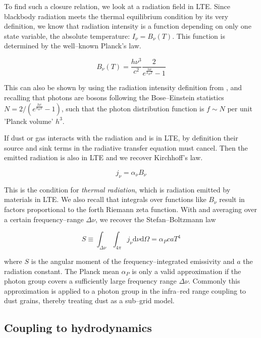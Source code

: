 To find such a closure relation, we look at a radiation field in LTE.
Since blackbody radiation meets the thermal equilibrium condition by its very definition, we know that radiation intensity is a function depending on only one state variable, the absolute temperature: $I_{\nu} = B_{\nu}(T)$.
This function is determined by the well--known Planck's law.

\begin{equation}
  B_{\nu}(T) = \frac{h\nu^{3}}{c^{2}} \frac{2}{e^{\frac{h\nu}{k_{B}T}} - 1}
\end{equation}

This can also be shown by using the radiation intensity definition from , and recalling that photons are bosons following the Bose--Einstein statistics $N=2 / (e^{\frac{h\nu}{k_{B}T}} - 1)$, such that the photon distribution function is $f\sim N$ per unit 'Planck volume' $h^{3}$.

If dust or gas interacts with the radiation and is in LTE, by definition their source and sink terms in the radiative transfer equation must cancel.
Then the emitted radiation is also in LTE and we recover Kirchhoff's law.

\begin{equation}
  j_{\nu} = \alpha_{\nu}B_{\nu}
\end{equation}

This is the condition for \textit{thermal radiation}, which is radiation emitted by materials in LTE.
We also recall that integrals over functions like $B_{\nu}$ result in factors proportional to the forth Riemann zeta function.
With  and averaging over a certain frequency--range $\Delta\nu$, we recover the Stefan--Boltzmann law

\begin{equation}
  S \equiv \int_{\Delta\nu}\int_{4\pi}j_{\nu}\mathrm{d}\nu\mathrm{d}\Omega = \alpha_{P}caT^{4}
\end{equation}

where $S$ is the angular moment of the frequency--integrated emissivity and $a$ the radiation constant.
The Planck mean $\alpha_{P}$ is only a valid approximation if the photon group covers a sufficiently large frequency range $\Delta\nu$.
Commonly this approximation is applied to a photon group in the infra--red range coupling to dust grains, thereby treating dust as a sub--grid model.

\subsection{Coupling to hydrodynamics}
\label{subsec:Coupling_to_HD}

